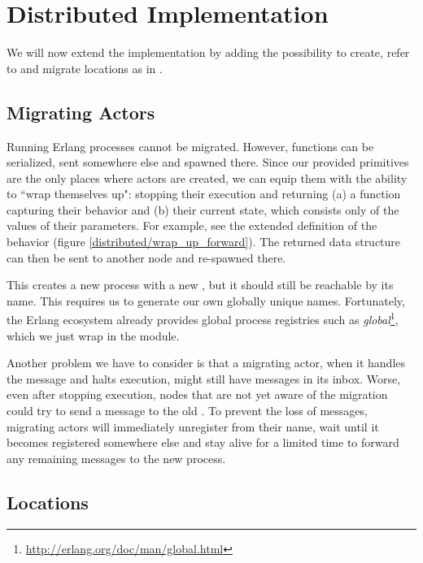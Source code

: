 \section{Distributed Implementation}

We will now extend the implementation by adding the possibility to
create, refer to and migrate locations as in \distjoincalc.


\subsection{Migrating Actors}
\label{ch_migration}

Running Erlang processes cannot be migrated.
However, functions can be serialized, sent somewhere else and spawned there.
Since our provided primitives are the only places where actors are created,
we can equip them with the ability to ``wrap themselves up":
stopping their execution and returning
(a) a function capturing their behavior and
(b) their current state, which consists only of the values of their parameters.
For example, see the extended definition of the  behavior
(figure \ref{distributed/wrap_up_forward}).
The returned data structure can then be sent to another node
and re-spawned there.


This creates a new process with a new \PID,
but it should still be reachable by its name.
This requires us to generate our own globally unique names.
Fortunately, the Erlang ecosystem already provides global process registries
such as \emph{global}\footnote{\url{http://erlang.org/doc/man/global.html}},
which we just wrap in the  module.

Another problem we have to consider is that a migrating actor,
when it handles the  message and halts execution,
might still have messages in its inbox.
Worse, even after stopping execution,
nodes that are not yet aware of the migration
could try to send a message to the old \PID.
To prevent the loss of messages, migrating actors will immediately unregister
from their name, wait until it becomes registered somewhere else
and stay alive for a limited time to forward any remaining messages
to the new process.


\subsection{Locations}

